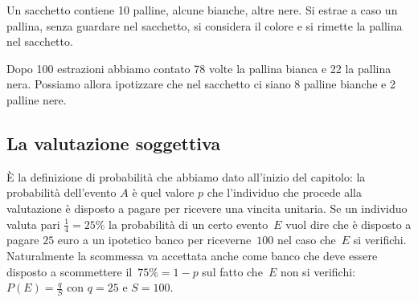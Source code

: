 \begin{esempio}
Un sacchetto contiene 10 palline, alcune bianche, altre nere. Si estrae a 
caso un pallina, senza guardare nel sacchetto, si considera il colore e si 
rimette la pallina nel sacchetto.

Dopo 100 estrazioni abbiamo contato 78 volte la pallina bianca e 22 la 
pallina nera. Possiamo allora ipotizzare che nel sacchetto ci siano 8 
palline bianche e 2 palline nere.
\end{esempio}

\subsection{La valutazione soggettiva}

È la definizione di probabilità che abbiamo dato all'inizio del capitolo: 
la probabilità dell'evento \(A\) è quel valore \(p\) che l'individuo che 
procede alla valutazione è disposto a pagare per ricevere una vincita 
unitaria. 
Se un individuo valuta pari \(\frac 1 4=25\%\) la probabilità di un certo 
evento~\(E\) vuol dire che è disposto a pagare \(25\) euro a un ipotetico banco 
per riceverne~\(100\) nel caso che~\(E\) si verifichi. Naturalmente la 
scommessa va accettata anche come banco che deve essere disposto a 
scommettere il~\(75\%=1-p\) sul fatto che~\(E\) non si 
verifichi: \(P(E)=\frac q S\) con \( q=25 \) e \(S=100\).

